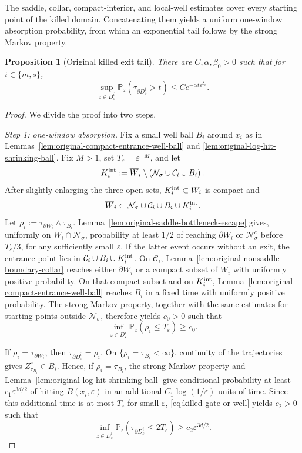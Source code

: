 \documentclass[11pt]{article}
\numberwithin{equation}{section}
\theoremstyle{plain}
\newtheorem{proposition}[theorem]{Proposition}
\theoremstyle{definition}
\theoremstyle{remark}
\newcommand{\eps}{\varepsilon}
\newcommand{\Pbb}{\mathbb P}
\begin{document}
The saddle, collar, compact-interior, and local-well estimates
cover every starting point of the killed domain.  Concatenating them yields a
uniform one-window absorption probability, from which an exponential tail
follows by the strong Markov property.

\begin{proposition}[Original killed exit tail]
\label{prop:original-killed-exit-tail}
There are $C,\alpha,\beta_0>0$ such that
for $i\in\{m,s\}$,
\[
\sup_{z\in D_\eps^i}
\Pbb_z(\tau_{\partial D_\eps^i}>t)
\le Ce^{-\alpha t\eps^{\beta_0}}.
\]
\end{proposition}


\begin{proof}
We divide the proof into two steps.

\emph{Step 1: one-window absorption.}
Fix a small well ball $B_i$ around $x_i$ as in
Lemmas~\ref{lem:original-compact-entrance-well-ball} and
\ref{lem:original-log-hit-shrinking-ball}.  Fix $M>1$, set
$T_\eps=\eps^{-M}$, and let
\[
K_i^{\rm int}
:=\overline W_i\setminus
\left(\mathcal N_\sigma\cup\mathcal C_i\cup B_i\right).
\]
After slightly enlarging the three open sets,
$K_i^{\rm int}\subset W_i$ is compact and
\[
\overline W_i
\subset \mathcal N_\sigma\cup\mathcal C_i\cup B_i\cup K_i^{\rm int}.
\]
Let $\rho_i:=\tau_{\partial W_i}\wedge\tau_{B_i}$.
Lemma~\ref{lem:original-saddle-bottleneck-escape} gives, uniformly on
$W_i\cap\mathcal N_\sigma$, probability at least $1/2$ of reaching
$\partial W_i$ or $\mathcal N_\sigma^c$ before $T_\eps/3$, for any sufficiently small
$\eps$.  If the latter event occurs without an exit, the entrance point lies
in $\mathcal C_i\cup B_i\cup K_i^{\rm int}$.  On $\mathcal C_i$,
Lemma~\ref{lem:original-nonsaddle-boundary-collar} reaches either
$\partial W_i$ or a compact subset of $W_i$ with uniformly positive
probability.  On that compact subset and on $K_i^{\rm int}$,
Lemma~\ref{lem:original-compact-entrance-well-ball} reaches $B_i$ in a fixed
time with uniformly positive probability.  The strong Markov property,
together with the same estimates for starting points outside
$\mathcal N_\sigma$, therefore yields $c_0>0$ such that
\begin{equation}
\label{eq:killed-gate-or-well}
\inf_{z\in D_\eps^i}
\Pbb_z\!\left(\rho_i\le T_\eps\right)\ge c_0.
\end{equation}

If $\rho_i=\tau_{\partial W_i}$, then
$\tau_{\partial D_\eps^i}=\rho_i$.  On
$\{\rho_i=\tau_{B_i}<\infty\}$, continuity of the trajectories gives
$Z_{\tau_{B_i}}^\eps\in\overline{B_i}$.  Hence, if
$\rho_i=\tau_{B_i}$, the strong Markov property and
Lemma~\ref{lem:original-log-hit-shrinking-ball} give conditional probability
at least $c_1\eps^{3d/2}$ of hitting $B(x_i,\eps)$ in an additional
$C_1\log(1/\eps)$ units of time.  Since this additional time is at
most $T_\eps$ for small $\eps$, \eqref{eq:killed-gate-or-well} yields
$c_2>0$ such that
\begin{equation}
\label{eq:killed-one-window-success}
\inf_{z\in D_\eps^i}
\Pbb_z\!\left(
\tau_{\partial D_\eps^i}\le 2T_\eps
\right)
\ge c_2\eps^{3d/2}.
\end{equation}


\end{proof}
\end{document}
